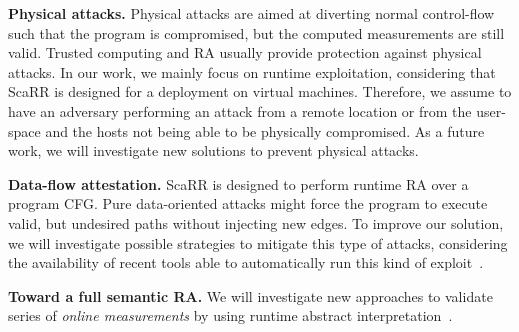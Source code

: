 \textbf{Physical attacks.}
Physical attacks are aimed at diverting normal control-flow such that the 
program is compromised, but the computed measurements are still valid. Trusted 
computing and RA usually provide protection against physical attacks. In our 
work, we mainly focus on runtime exploitation, considering that ScaRR is 
designed for a deployment on virtual machines. Therefore, we assume to have an 
adversary performing an attack from a remote location or from the user-space 
and the hosts not being able to be physically compromised. As a future work, we 
will investigate new solutions to prevent physical attacks.

\textbf{Data-flow attestation.}
ScaRR is designed to perform runtime RA over a program CFG. Pure data-oriented 
attacks might force the program to execute valid, but undesired paths without 
injecting new edges. To improve our solution, we will investigate possible 
strategies to mitigate this type of attacks, considering the availability of 
recent tools able to automatically run this kind of exploit~\citep{hu2016data}. 

\textbf{Toward a full semantic RA.}
We will investigate new approaches to validate series of \emph{online 
measurements} by using runtime abstract 
interpretation~\citep{Ge:2017:GGC:3037697.3037716,hu2018enforcing,Liu:2018:RED:3243734.3243826}.
